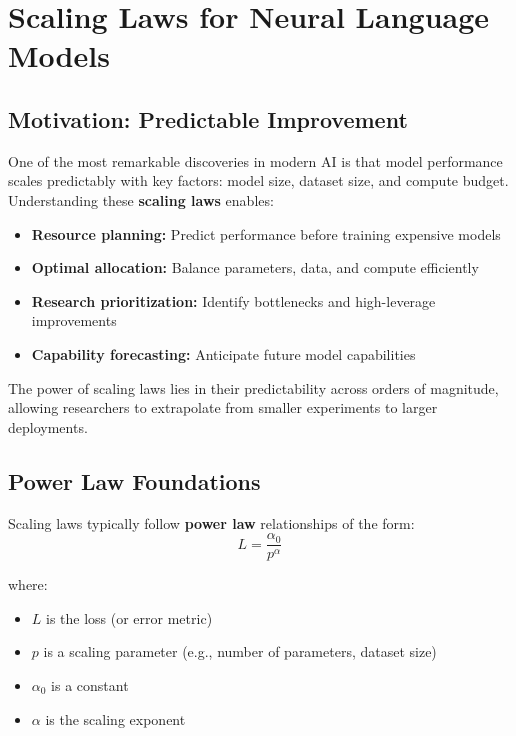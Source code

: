 \documentclass[class=article,crop=false]{standalone}
\begin{document}
\section{Scaling Laws for Neural Language Models}
\label{sec:scaling}

\subsection{Motivation: Predictable Improvement}
\label{sec:scaling:motivation}

One of the most remarkable discoveries in modern AI is that model performance scales predictably with key factors: model size, dataset size, and compute budget. Understanding these \textbf{scaling laws} enables:
\begin{itemize}
  \item \textbf{Resource planning:} Predict performance before training expensive models
  \item \textbf{Optimal allocation:} Balance parameters, data, and compute efficiently
  \item \textbf{Research prioritization:} Identify bottlenecks and high-leverage improvements
  \item \textbf{Capability forecasting:} Anticipate future model capabilities
\end{itemize}

The power of scaling laws lies in their predictability across orders of magnitude, allowing researchers to extrapolate from smaller experiments to larger deployments.

\subsection{Power Law Foundations}
\label{sec:scaling:power}

Scaling laws typically follow \textbf{power law} relationships of the form:
\begin{equation}
  L = \frac{\alpha_0}{p^\alpha}
  \label{eq:power-law}
\end{equation}

where:
\begin{itemize}
  \item $L$ is the loss (or error metric)
  \item $p$ is a scaling parameter (e.g., number of parameters, dataset size)
  \item $\alpha_0$ is a constant
  \item $\alpha$ is the scaling exponent
\end{itemize}
\end{document}
